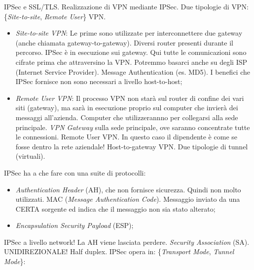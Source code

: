 IPSec e SSL/TLS. Realizzazione di VPN mediante IPSec. Due tipologie di VPN: \{\textit{Site-to-site}, \textit{Remote User}\} VPN.

\begin{itemize}

\item{\textit{Site-to-site VPN}}: Le prime sono utilizzate per interconnettere due gateway (anche chiamata gateway-to-gateway). Diversi router presenti durante il percorso. IPSec è in esecuzione sui gateway. Qui tutte le comunicazioni sono cifrate prima che attraversino la VPN. Potremmo basarci anche su degli ISP (Internet Service Provider). Message Authentication (es. MD5). I benefici che IPSec fornisce non sono necessari a livello host-to-host;

\item{\textit{Remote User VPN}}: Il processo VPN non starà sul router di confine dei vari siti (gateway), ma sarà in esecuzione proprio sul computer che invierà dei messaggi all'azienda. Computer che utilizzerannno per collegarsi alla sede principale. \textit{VPN Gateway} sulla sede principale, ove saranno concentrate tutte le connessioni. Remote User VPN. In questo caso il dipendente è come se fosse dentro la rete aziendale! Host-to-gateway VPN. Due tipologie di tunnel (virtuali).

\end{itemize}

IPSec ha a che fare con una suite di protocolli:

\begin{itemize}

\item{\textit{Authentication Header} (AH)}, che non fornisce sicurezza. Quindi non molto utilizzati. MAC (\textit{Message Authentication Code}). Messaggio inviato da una CERTA sorgente ed indica che il messaggio non sia stato alterato;

\item{\textit{Encapsulation Security Payload} (ESP)};
\end{itemize}

IPSec a livello network! La AH viene lasciata perdere. \textit{Security Association} (SA). UNIDIREZIONALE! Half duplex. IPSec opera in: \{\textit{Transport Mode}, \textit{Tunnel Mode}\}:

